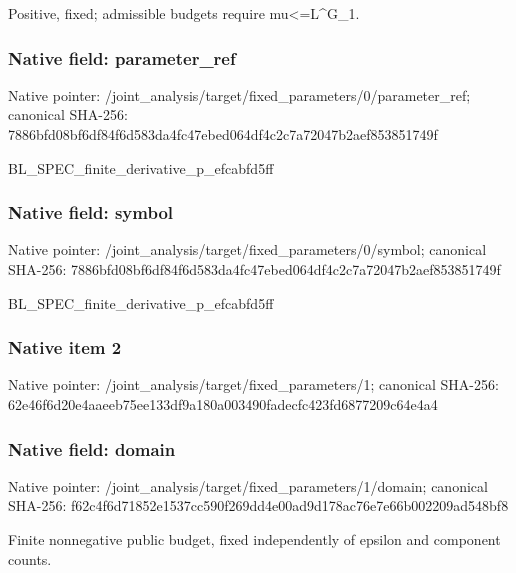 \documentclass[10pt,a4paper]{article}
\begin{document}
\begingroup\raggedright\sloppy Positive,\allowbreak{} fixed;\allowbreak{} admissible budgets require mu<=\allowbreak{}L\textasciicircum{}G\_\allowbreak{}1.\par\endgroup

\subsubsection{Native field: parameter\_\allowbreak{}ref}
Native pointer: /joint\_\allowbreak{}analysis/target/fixed\_\allowbreak{}parameters/0/parameter\_\allowbreak{}ref; canonical SHA-256: 7886bfd08bf6df84f6d583da4fc47ebed064df4c2c7a72047b2aef853851749f

\begingroup\raggedright\sloppy BL\_\allowbreak{}SPEC\_\allowbreak{}finite\_\allowbreak{}derivative\_\allowbreak{}p\_\allowbreak{}efcabfd5ff\par\endgroup

\subsubsection{Native field: symbol}
Native pointer: /joint\_\allowbreak{}analysis/target/fixed\_\allowbreak{}parameters/0/symbol; canonical SHA-256: 7886bfd08bf6df84f6d583da4fc47ebed064df4c2c7a72047b2aef853851749f

\begingroup\raggedright\sloppy BL\_\allowbreak{}SPEC\_\allowbreak{}finite\_\allowbreak{}derivative\_\allowbreak{}p\_\allowbreak{}efcabfd5ff\par\endgroup

\subsubsection{Native item 2}
Native pointer: /joint\_\allowbreak{}analysis/target/fixed\_\allowbreak{}parameters/1; canonical SHA-256: 62e46f6d20e4aaeeb75ee133df9a180a003490fadecfc423fd6877209c64e4a4

\subsubsection{Native field: domain}
Native pointer: /joint\_\allowbreak{}analysis/target/fixed\_\allowbreak{}parameters/1/domain; canonical SHA-256: f62c4f6d71852e1537cc590f269dd4e00ad9d178ac76e7e66b002209ad548bf8

\begingroup\raggedright\sloppy Finite nonnegative public budget,\allowbreak{} fixed independently of epsilon and component counts.\par\endgroup
\end{document}
